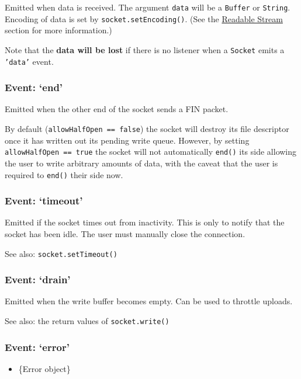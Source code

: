 Emitted when data is received. The argument \texttt{data} will be a
\texttt{Buffer} or \texttt{String}. Encoding of data is set by
\texttt{socket.setEncoding()}. (See the
\href{stream.html\#stream_readable_stream}{Readable Stream} section for
more information.)

Note that the \textbf{data will be lost} if there is no listener when a
\texttt{Socket} emits a \texttt{'data'} event.

\subsubsection{Event: `end'}\label{event-end}

Emitted when the other end of the socket sends a FIN packet.

By default (\texttt{allowHalfOpen == false}) the socket will destroy its
file descriptor once it has written out its pending write queue.
However, by setting \texttt{allowHalfOpen == true} the socket will not
automatically \texttt{end()} its side allowing the user to write
arbitrary amounts of data, with the caveat that the user is required to
\texttt{end()} their side now.

\subsubsection{Event: `timeout'}\label{event-timeout}

Emitted if the socket times out from inactivity. This is only to notify
that the socket has been idle. The user must manually close the
connection.

See also: \texttt{socket.setTimeout()}

\subsubsection{Event: `drain'}\label{event-drain}

Emitted when the write buffer becomes empty. Can be used to throttle
uploads.

See also: the return values of \texttt{socket.write()}

\subsubsection{Event: `error'}\label{event-error-1}

\begin{itemize}
\itemsep1pt\parskip0pt
\item
  \{Error object\}
\end{itemize}

